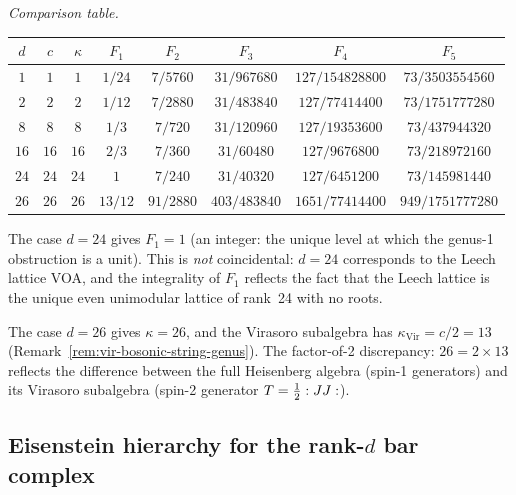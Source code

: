 \begin{computation}
\emph{Comparison table.}
\begin{center}
\renewcommand{\arraystretch}{1.3}
\begin{tabular}{c|ccccccc}
$d$ & $c$ & $\kappa$ & $F_1$ & $F_2$ & $F_3$ & $F_4$ & $F_5$ \\
\hline
$1$ & $1$ & $1$ & $1/24$ & $7/5760$ & $31/967680$ & $127/154828800$ & $73/3503554560$ \\
$2$ & $2$ & $2$ & $1/12$ & $7/2880$ & $31/483840$ & $127/77414400$ & $73/1751777280$ \\
$8$ & $8$ & $8$ & $1/3$ & $7/720$ & $31/120960$ & $127/19353600$ & $73/437944320$ \\
$16$ & $16$ & $16$ & $2/3$ & $7/360$ & $31/60480$ & $127/9676800$ & $73/218972160$ \\
$24$ & $24$ & $24$ & $1$ & $7/240$ & $31/40320$ & $127/6451200$ & $73/145981440$ \\
$26$ & $26$ & $26$ & $13/12$ & $91/2880$ & $403/483840$ & $1651/77414400$ & $949/1751777280$
\end{tabular}
\end{center}

The case $d = 24$ gives $F_1 = 1$ (an integer: the unique level at
which the genus-1 obstruction is a unit).  This is \emph{not}
coincidental: $d = 24$ corresponds to the Leech lattice VOA, and
the integrality of $F_1$ reflects the fact that the Leech lattice
is the unique even unimodular lattice of rank~24 with no roots.

The case $d = 26$ gives $\kappa = 26$, and the Virasoro subalgebra
has $\kappa_{\mathrm{Vir}} = c/2 = 13$
(Remark~\ref{rem:vir-bosonic-string-genus}).  The factor-of-2
discrepancy: $26 = 2 \times 13$ reflects the difference between the
full Heisenberg algebra (spin-1 generators) and its Virasoro
subalgebra (spin-2 generator $T = \frac{1}{2}:{JJ}:$).
\end{computation}


\subsection{\texorpdfstring{Eisenstein hierarchy for the rank-$d$ bar complex}{Eisenstein hierarchy for the rank-d bar complex}}

